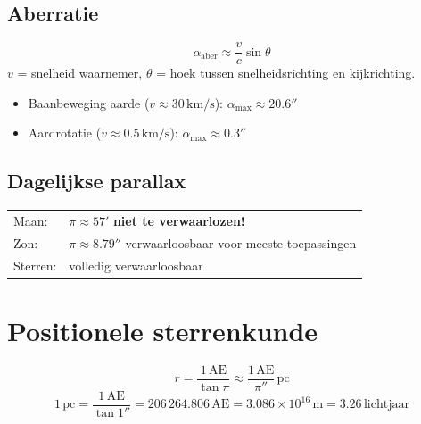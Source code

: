 \documentclass[11pt, a4paper]{article}
\newcommand{\boogmin}{'}
\newcommand{\boogsec}{''}
\newcommand{\AstrE}{\mathrm{AE}}
\begin{document}
\subsection{Aberratie}

\begin{formule}[Aberratiehoek]
\[
  \alpha_\mathrm{aber} \approx \frac{v}{c}\sin\theta
\]
$v$ = snelheid waarnemer, $\theta$ = hoek tussen snelheidsrichting en kijkrichting.
\begin{itemize}[leftmargin=1.5em, itemsep=1pt]
  \item Baanbeweging aarde ($v \approx 30\,\mathrm{km/s}$): $\alpha_\mathrm{max} \approx 20.6\boogsec$
  \item Aardrotatie ($v \approx 0.5\,\mathrm{km/s}$): $\alpha_\mathrm{max} \approx 0.3\boogsec$
\end{itemize}
\end{formule}

\subsection{Dagelijkse parallax}

\begin{weetje}
\renewcommand{\arraystretch}{1.2}
\begin{tabular}{ll}
  Maan:  & $\pi \approx 57\boogmin$ \quad \textbf{niet te verwaarlozen!} \\
  Zon:   & $\pi \approx 8.79\boogsec$ \quad verwaarloosbaar voor meeste toepassingen \\
  Sterren: & volledig verwaarloosbaar \\
\end{tabular}
\end{weetje}

\section{Positionele sterrenkunde}

\begin{formule}
\[
  r = \frac{1\,\AstrE}{\tan\pi} \approx \frac{1\,\AstrE}{\pi''}\,\mathrm{pc}
\]
\[
  1\,\mathrm{pc} = \frac{1\,\AstrE}{\tan 1\boogsec} = 206\,264.806\,\AstrE
               = 3.086\times10^{16}\,\mathrm{m} = 3.26\,\mathrm{lichtjaar}
\]
\end{formule}
\end{document}
